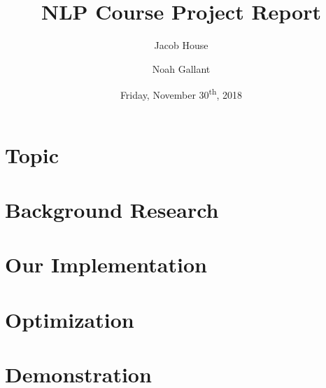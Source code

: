 \documentclass[12pt]{article}
\title{NLP Course Project Report}
\author{Jacob House \and Noah Gallant}
\date{Friday, November 30\textsuperscript{th}, 2018}
\begin{document}
	\maketitle
	\tableofcontents 
	
	\section{Topic}
	
	
	\section{Background Research}
	
	
	\section{Our Implementation}
	
	
	\section{Optimization}
	
	
	\printbibliography
	\appendix
	\section{Demonstration}
	
	
	
\end{document}
